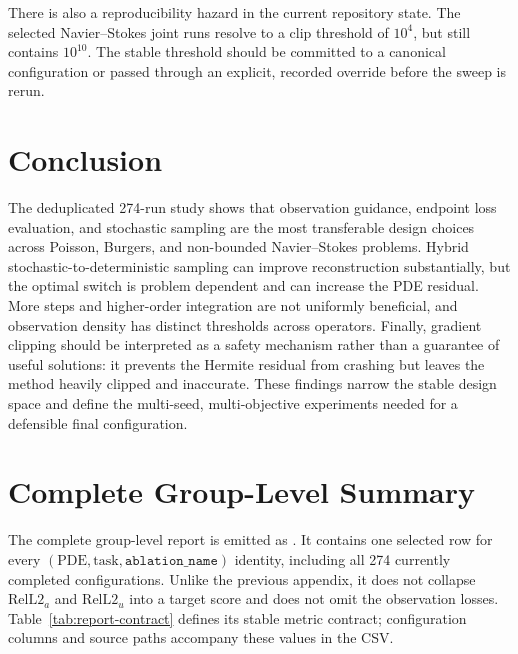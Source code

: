 \documentclass[twoside,11pt]{article}
\newcommand{\relA}{\mathrm{RelL2}_a}
\newcommand{\relU}{\mathrm{RelL2}_u}
\begin{document}
There is also a reproducibility hazard in the current repository state.  The
selected Navier--Stokes joint runs resolve to a clip threshold of \(10^4\),
but  still contains \(10^{10}\).
The stable threshold should be committed to a canonical configuration or
passed through an explicit, recorded override before the sweep is rerun.

\section{Conclusion}
\label{sec:conclusion}

The deduplicated 274-run study shows that observation guidance, endpoint loss
evaluation, and stochastic sampling are the most transferable design choices
across Poisson, Burgers, and non-bounded Navier--Stokes problems.  Hybrid
stochastic-to-deterministic sampling can improve reconstruction substantially,
but the optimal switch is problem dependent and can increase the PDE residual.
More steps and higher-order integration are not uniformly beneficial, and
observation density has distinct thresholds across operators.  Finally,
gradient clipping should be interpreted as a safety mechanism rather than a
guarantee of useful solutions: it prevents the Hermite residual from crashing
but leaves the method heavily clipped and inaccurate.  These findings narrow
the stable design space and define the multi-seed, multi-objective experiments
needed for a defensible final configuration.

\appendix

\section{Complete Group-Level Summary}
\label{app:complete}

The complete group-level report is emitted as
.  It contains one selected row for every
\((\mathrm{PDE},\mathrm{task},\texttt{ablation\_name})\) identity, including
all 274 currently completed configurations.  Unlike the previous appendix,
it does not collapse \(\relA\) and \(\relU\) into a target score and does not
omit the observation losses.  Table~\ref{tab:report-contract} defines its
stable metric contract; configuration columns and source paths accompany
these values in the CSV.
\end{document}
